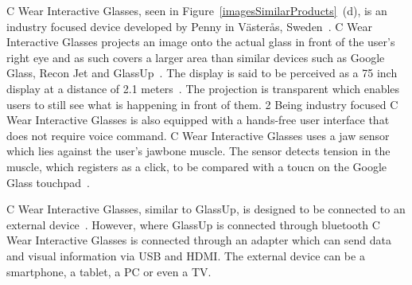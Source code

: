 C Wear Interactive Glasses, seen in Figure~\ref{imagesSimilarProducts}~(d), is an industry focused device developed by Penny in V{\"a}ster{\aa}s, Sweden~\cite{pennyCompany}. C Wear Interactive Glasses projects an image onto the actual glass in front of the user's right eye and as such covers a larger area than similar devices such as Google Glass, Recon Jet and GlassUp~\cite{pennyDisplay}. The display is said to be perceived as a 75 inch display at a distance of 2.1 meters~\cite{pennyProducts}. The projection is transparent which enables users to still see what is happening in front of them.
2
Being industry focused C Wear Interactive Glasses is also equipped with a hands-free user interface  that does not require voice command. C Wear Interactive Glasses uses a jaw sensor which lies against the user's jawbone muscle. The sensor detects tension in the muscle, which registers as a click, to be compared with a toucn on the Google Glass touchpad~\cite{pennyProducts}.

C Wear Interactive Glasses, similar to GlassUp, is designed to be connected to an external device~\cite{pennyProducts}. However, where GlassUp is connected through bluetooth C Wear Interactive Glasses is connected through an adapter which can send data and visual information via USB and HDMI. The external device can be a smartphone, a tablet, a PC or even a TV.
